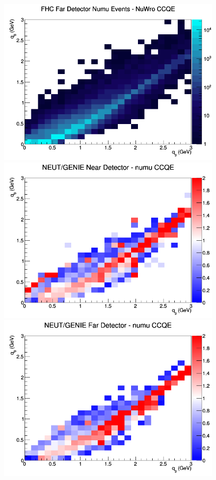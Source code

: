 \begin{figure}[h]
\endminipage
{}
\includegraphics[width=\linewidth]{eff_q0_q3/FGT/CCQE_FHC_FD_numu_q3_q0_NuWro.png}
\endminipage
\newline
{}
\includegraphics[width=\linewidth]{eff_q0_q3/FGT/ratios/CCQE_NEUT_GENIE_numu_near_q3_q0.png}
\endminipage
{}
\includegraphics[width=\linewidth]{eff_q0_q3/FGT/ratios/CCQE_NEUT_GENIE_numu_far_q3_q0.png}

\end{figure}
